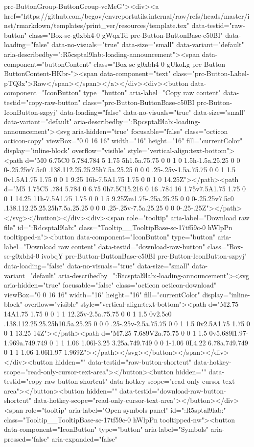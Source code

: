 {{{{{{{{{{{{{{{{{{{{{{{{{{{{{{{prc-ButtonGroup-ButtonGroup-vcMeG"><div><a href="https://github.com/bcgov/envreportutils.internal/raw/refs/heads/master/inst/rmarkdown/templates/print_ver/resources/template.tex" data-testid="raw-button" class="Box-sc-g0xbh4-0 gWqxTd prc-Button-ButtonBase-c50BI" data-loading="false" data-no-visuals="true" data-size="small" data-variant="default" aria-describedby=":R5csptal9lab:-loading-announcement"><span data-component="buttonContent" class="Box-sc-g0xbh4-0 gUkoLg prc-Button-ButtonContent-HKbr-"><span data-component="text" class="prc-Button-Label-pTQ3x">Raw</span></span></a></div><div><button data-component="IconButton" type="button" aria-label="Copy raw content" data-testid="copy-raw-button" class="prc-Button-ButtonBase-c50BI prc-Button-IconButton-szpyj" data-loading="false" data-no-visuals="true" data-size="small" data-variant="default" aria-describedby=":Rpcsptal9lab:-loading-announcement"><svg aria-hidden="true" focusable="false" class="octicon octicon-copy" viewBox="0 0 16 16" width="16" height="16" fill="currentColor" display="inline-block" overflow="visible" style="vertical-align:text-bottom"><path d="M0 6.75C0 5.784.784 5 1.75 5h1.5a.75.75 0 0 1 0 1.5h-1.5a.25.25 0 0 0-.25.25v7.5c0 .138.112.25.25.25h7.5a.25.25 0 0 0 .25-.25v-1.5a.75.75 0 0 1 1.5 0v1.5A1.75 1.75 0 0 1 9.25 16h-7.5A1.75 1.75 0 0 1 0 14.25Z"></path><path d="M5 1.75C5 .784 5.784 0 6.75 0h7.5C15.216 0 16 .784 16 1.75v7.5A1.75 1.75 0 0 1 14.25 11h-7.5A1.75 1.75 0 0 1 5 9.25Zm1.75-.25a.25.25 0 0 0-.25.25v7.5c0 .138.112.25.25.25h7.5a.25.25 0 0 0 .25-.25v-7.5a.25.25 0 0 0-.25-.25Z"></path></svg></button></div><div><span role="tooltip" aria-label="Download raw file" id=":Rdcsptal9lab:" class="Tooltip__TooltipBase-sc-17tf59c-0 hWlpPn tooltipped-n"><button data-component="IconButton" type="button" aria-label="Download raw content" data-testid="download-raw-button" class="Box-sc-g0xbh4-0 ivobqY prc-Button-ButtonBase-c50BI prc-Button-IconButton-szpyj" data-loading="false" data-no-visuals="true" data-size="small" data-variant="default" aria-describedby=":Rtcsptal9lab:-loading-announcement"><svg aria-hidden="true" focusable="false" class="octicon octicon-download" viewBox="0 0 16 16" width="16" height="16" fill="currentColor" display="inline-block" overflow="visible" style="vertical-align:text-bottom"><path d="M2.75 14A1.75 1.75 0 0 1 1 12.25v-2.5a.75.75 0 0 1 1.5 0v2.5c0 .138.112.25.25.25h10.5a.25.25 0 0 0 .25-.25v-2.5a.75.75 0 0 1 1.5 0v2.5A1.75 1.75 0 0 1 13.25 14Z"></path><path d="M7.25 7.689V2a.75.75 0 0 1 1.5 0v5.689l1.97-1.969a.749.749 0 1 1 1.06 1.06l-3.25 3.25a.749.749 0 0 1-1.06 0L4.22 6.78a.749.749 0 1 1 1.06-1.06l1.97 1.969Z"></path></svg></button></span></div></div><button hidden="" data-testid="raw-button-shortcut" data-hotkey-scope="read-only-cursor-text-area"></button><button hidden="" data-testid="copy-raw-button-shortcut" data-hotkey-scope="read-only-cursor-text-area"></button><button hidden="" data-testid="download-raw-button-shortcut" data-hotkey-scope="read-only-cursor-text-area"></button></div><span role="tooltip" aria-label="Open symbols panel" id=":R5sptal9lab:" class="Tooltip__TooltipBase-sc-17tf59c-0 hWlpPn tooltipped-nw"><button data-component="IconButton" type="button" aria-label="Symbols" aria-pressed="false" aria-expanded="false" }}}}}}}}}}}}}}}}}}}}}}}}}}}}}}}

